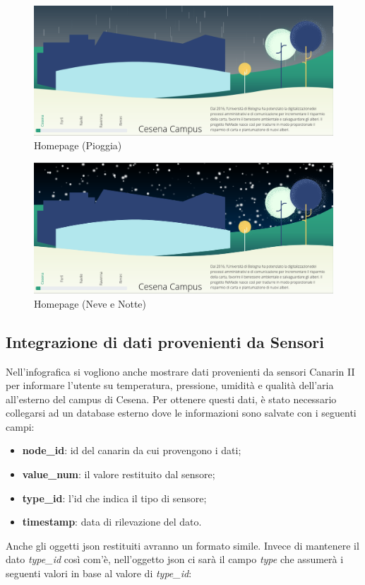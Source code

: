 \begin{figure}[H]
    \centering
    \includegraphics[width=\linewidth]{img/rain.png}
        \caption{Homepage (Pioggia)}
    \label{fig:dayrain}
\end{figure}

\begin{figure}[H]
    \centering
    \includegraphics[width=\linewidth]{img/snow.png}
        \caption{Homepage (Neve e Notte)}
    \label{fig:nightsnow}
\end{figure}

\subsection{Integrazione di dati provenienti da Sensori}
\noindent Nell’infografica si vogliono anche mostrare dati provenienti da sensori Canarin II per informare l’utente su temperatura, pressione, umidità e qualità dell’aria all’esterno del campus di Cesena. Per ottenere questi dati, è stato necessario collegarsi ad un database esterno dove le informazioni sono salvate con i seguenti campi:
\begin{itemize}
\item \textbf{node\_id}: id del canarin da cui provengono i dati;
\item \textbf{value\_num}: il valore restituito dal sensore;
\item \textbf{type\_id}: l’id che indica il tipo di sensore; 
\item \textbf{timestamp}: data di rilevazione del dato.
\end{itemize}
Anche gli oggetti json restituiti avranno un formato simile. Invece di mantenere il dato \textit{type\_id} così com'è, nell'oggetto json ci sarà il campo \textit{type} che assumerà i seguenti valori in base al valore di \textit{type\_id}:

